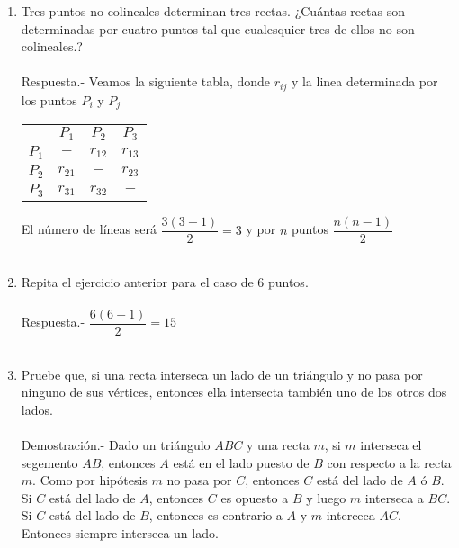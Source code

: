 \documentclass[10pt]{article}
\begin{document}
\begin{enumerate}
    \item Tres puntos no colineales determinan tres rectas. ¿Cuántas rectas son determinadas por cuatro puntos tal que cualesquier tres de ellos no son colineales.?\\\\
    Respuesta.-\; Veamos la siguiente tabla, donde $r_{ij}$ y la linea determinada por los puntos $P_i$ y $P_j$
    \begin{center}
	\begin{tabular}{cccc}
	    &$P_1$&$P_2$&$P_3$\\
	    $P_1$&$-$&$r_{12}$&$r_{13}$\\
	    $P_2$&$r_{21}$&$-$&$r_{23}$\\
	    $P_3$&$r_{31}$&$r_{32}$&$-$\\
	\end{tabular}
    \end{center}
    El número de líneas será $\dfrac{3(3-1)}{2}=3$ y por $n$ puntos $\dfrac{n(n-1)}{2}$\\\\

    \item Repita el ejercicio anterior para el caso de $6$ puntos.\\\\
    Respuesta.-\; $\dfrac{6(6-1)}{2}=15$\\\\

    \item Pruebe que, si una recta interseca un lado de un triángulo y no pasa por ninguno de sus vértices, entonces ella intersecta también uno de los otros dos lados.\\\\
    Demostración.-\; Dado un triángulo $ABC$ y una recta $m$, si $m$ interseca el segemento $AB$, entonces $A$ está en el lado puesto de $B$ con respecto a la recta $m$. Como por hipótesis $m$ no pasa por $C$, entonces $C$ está del lado de $A$ ó $B$.\\
    Si $C$ está del lado de $A$, entonces $C$ es opuesto a $B$ y luego $m$ interseca a $BC$.\\
    Si $C$ está del lado de $B$, entonces es contrario a $A$ y $m$ interceca $AC$.\\
    Entonces siempre interseca un lado.\\\\


\end{enumerate}
\end{document}
